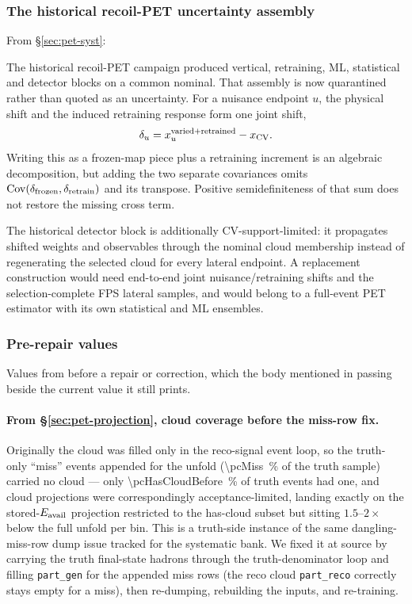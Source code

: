 \subsubsection{The historical recoil-PET uncertainty assembly}
\label{app:history-petbudget}
From \S\ref{sec:pet-syst}:

The historical recoil-PET campaign produced vertical, retraining, ML, statistical and detector blocks on a common nominal.  That assembly is now quarantined rather than quoted as an uncertainty.  For a nuisance endpoint $u$, the physical shift and the induced retraining response form one joint shift,
\begin{equation}
  \delta_u=x_u^{\rm varied+retrained}-x_{\rm CV}.
\end{equation}
Writing this as a frozen-map piece plus a retraining increment is an algebraic decomposition, but adding the two separate covariances omits $\operatorname{Cov}(\delta_{\rm frozen},\delta_{\rm retrain})$ and its transpose.  Positive semidefiniteness of that sum does not restore the missing cross term.

The historical detector block is additionally CV-support-limited: it propagates shifted weights and observables through the nominal cloud membership instead of regenerating the selected cloud for every lateral endpoint.  A replacement construction would need end-to-end joint nuisance/retraining shifts and the selection-complete FPS lateral samples, and would belong to a full-event PET estimator with its own statistical and ML ensembles.

\subsubsection{Pre-repair values}
\label{app:history-pet-prerepair}
Values from before a repair or correction, which the body mentioned in passing beside the current value it still prints.

\paragraph{From \S\ref{sec:pet-projection}, cloud coverage before the miss-row fix.} Originally the cloud was filled only in the reco-signal event loop, so the truth-only ``miss'' events appended for the unfold (\SI{\pcMiss}{\percent} of the truth sample) carried no cloud --- only \SI{\pcHasCloudBefore}{\percent} of truth events had one, and cloud projections were correspondingly acceptance-limited, landing exactly on the stored-$E_{\mathrm{avail}}$ projection restricted to the has-cloud subset but sitting $1.5$--$2\times$ below the full unfold per bin. This is a truth-side instance of the same dangling-miss-row dump issue tracked for the systematic bank. We fixed it at source by carrying the truth final-state hadrons through the truth-denominator loop and filling \texttt{part\_gen} for the appended miss rows (the reco cloud \texttt{part\_reco} correctly stays empty for a miss), then re-dumping, rebuilding the inputs, and re-training.

